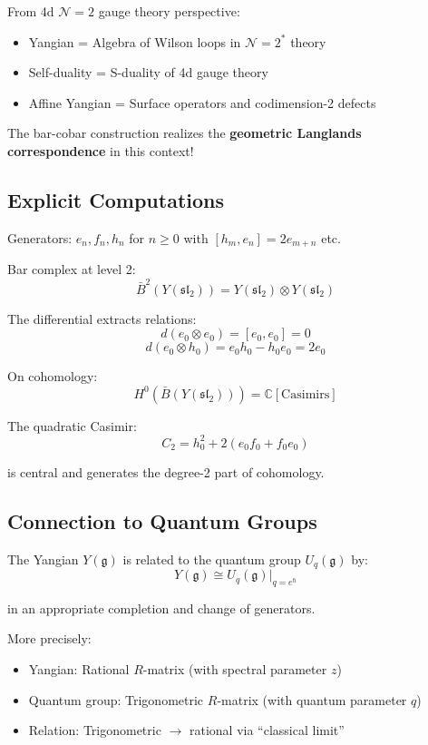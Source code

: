 \begin{remark}
From 4d $\mathcal{N}=2$ gauge theory perspective:
\begin{itemize}
\item Yangian = Algebra of Wilson loops in $\mathcal{N}=2^*$ theory
\item Self-duality = S-duality of 4d gauge theory
\item Affine Yangian = Surface operators and codimension-2 defects
\end{itemize}

The bar-cobar construction realizes the \textbf{geometric Langlands correspondence} 
in this context!
\end{remark}

\subsection{Explicit Computations}

\begin{example}
Generators: $e_n, f_n, h_n$ for $n \geq 0$ with $[h_m, e_n] = 2e_{m+n}$ etc.

Bar complex at level 2:
$$\bar{B}^2(Y(\mathfrak{sl}_2)) = Y(\mathfrak{sl}_2) \otimes Y(\mathfrak{sl}_2)$$

The differential extracts relations:
$$d(e_0 \otimes e_0) = [e_0, e_0] = 0$$
$$d(e_0 \otimes h_0) = e_0 h_0 - h_0 e_0 = 2e_0$$

On cohomology:
$$H^0(\bar{B}(Y(\mathfrak{sl}_2))) = \mathbb{C}[\text{Casimirs}]$$

The quadratic Casimir:
$$C_2 = h_0^2 + 2(e_0 f_0 + f_0 e_0)$$

is central and generates the degree-2 part of cohomology.
\end{example}

\subsection{Connection to Quantum Groups}

\begin{theorem}
The Yangian $Y(\mathfrak{g})$ is related to the quantum group $U_q(\mathfrak{g})$ by:
$$Y(\mathfrak{g}) \cong U_q(\mathfrak{g})|_{q = e^\hbar}$$

in an appropriate completion and change of generators.

More precisely:
\begin{itemize}
\item Yangian: Rational $R$-matrix (with spectral parameter $z$)
\item Quantum group: Trigonometric $R$-matrix (with quantum parameter $q$)
\item Relation: Trigonometric $\to$ rational via ``classical limit''
\end{itemize}
\end{theorem}

